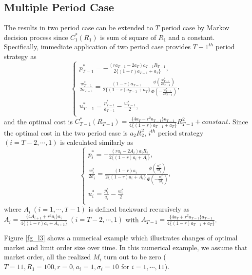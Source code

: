 \subsection{Multiple Period Case}\label{sec_l23}
The results in two period case can be extended to $T$ period case by Markov decision process since $C_1^*(R_1)$ is sum of square of $R_1$ and a constant.  Specifically, immediate application of two period case provides $T-1^{th}$ period strategy as
\[ %
 \left\{
  \begin{array}{ll}
   \displaystyle p_{T-1}^* = -\frac{(ra_{T-1}-2a_T)a_{T-1}R_{T-1}}{2\{(1-r)a_{T-1}+a_T\}}, \\
   \displaystyle \frac{w_{T-1}^*}{2\sigma_{T-1}}= \frac{(1-r)a_{T-1}}{2\{(1-r)a_{T-1}+a_T\}}\frac{\phi(\frac{w_{T-1}^*}{2\sigma_{T-1}})}{\Phi(-\frac{w_{T-1}^*}{2\sigma_{T-1}})},\\
   \displaystyle u_{T-1}^*= \frac{p_{T-1}^*}{a_{T-1}}-\frac{w_{T-1}^*}{2},\\
  \end{array}
  \right.
\] %
and the optimal cost is $\displaystyle C_{T-1}^*(R_{T-1})=\frac{\{4a_T-r^2a_{T-1}\}a_{T-1}}{4\{(1-r)a_{T-1}+a_T\}}R_{T-1}^2+constant.$  Since the optimal cost in the two period case is $a_2 R_2^2$, $i^{th}$ period strategy $(i=T-2,\cdots,1)$ is calculated similarly as
\[ %
 \left\{
  \begin{array}{ll}
   \displaystyle p_i^* = -\frac{(ra_i-2A_i)a_iR_i}{2\{(1-r)a_i+A_i\}}, \\
   \displaystyle \frac{w_i^*}{2\sigma_i}= \frac{(1-r)a_i}{2\{(1-r)a_i+A_i\}}\frac{\phi(\frac{w_i^*}{2\sigma_i})}{\Phi(-\frac{w_i^*}{2\sigma_i})},\\
   \displaystyle u_i^*= \frac{p_i^*}{a_i}-\frac{w_i^*}{2}\\
  \end{array}
  \right.
\] %
where $A_i\ (i=1,\cdots,T-1)$ is defined backward recursively as $\displaystyle
A_i=\frac{\{4A_{i+1}+r^2a_i\}a_i}{4\{(1-r)a_i+A_{i+1}\}}\ (i=T-2,\cdots,1)$ with
$\displaystyle A_{T-1}=\frac{\{4a_T+r^2a_{T-1}\}a_{T-1}}{4\{(1-r)a_{T-1}+a_T\}}$.

Figure \ref{fg_l3} shows a numerical example which illustrates changes of optimal market and limit order size over time.  In this numerical example, we assume that market order, all the realized $M_i$ turn out to be zero ($T=11, R_1=100, r=0, a_i=1, \sigma_i=10$ for $i=1,\cdots,11$).

